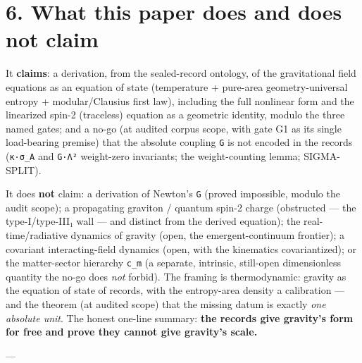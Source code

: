 \documentclass[11pt]{article}
\begin{document}
\section*{6. What this paper does and does not claim}
It \textbf{claims}: a derivation, from the sealed-record ontology, of the gravitational field equations as an equation of state (temperature + pure-area geometry-universal entropy + modular/Clausius first law), including the full nonlinear form and the linearized spin-2 (traceless) equation as a geometric identity, modulo the three named gates; and a no-go (at audited corpus scope, with gate G1 as its single load-bearing premise) that the absolute coupling \texttt{G} is not encoded in the records (\texttt{κ·σ\_A} and \texttt{G·Λ²} weight-zero invariants; the weight-counting lemma; SIGMA-SPLIT).

It does \textbf{not} claim: a derivation of Newton's \texttt{G} (proved impossible, modulo the audit scope); a propagating graviton / quantum spin-2 charge (obstructed — the type-I/type-III₁ wall — and distinct from the derived equation); the real-time/radiative dynamics of gravity (open, the emergent-continuum frontier); a covariant interacting-field dynamics (open, with the kinematics covariantized); or the matter-sector hierarchy \texttt{c\_m} (a separate, intrinsic, still-open dimensionless quantity the no-go does \emph{not} forbid). The framing is thermodynamic: gravity as the equation of state of records, with the entropy-area density a calibration — and the theorem (at audited scope) that the missing datum is exactly \emph{one absolute unit}. The honest one-line summary: \textbf{the records give gravity's form for free and prove they cannot give gravity's scale.}

---
\end{document}
